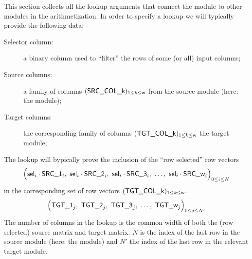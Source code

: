 This section collects all the lookup arguments that connect the \hubMod{} module to other modules in the arithmetization. In order to specify a lookup we will typically provide the following data:
\begin{description}
	\item[Selector column:] a binary column  used to ``filter'' the rows of some (or all) input columns;
	\item[Source columns:] a family of columns $(\textsf{SRC\_COL\_k})_{1 \leq k \leq \textsf{w}}$ from the source module (here: the \hubMod{} module); 
	\item[Target columns:] the corresponding family of columns $(\textsf{TGT\_COL\_k})_{1 \leq k \leq \textsf{w}}$ the target module;
\end{description}
The lookup will bypically prove the inclusion of the ``row selected'' row vectors
\[
	\Big(
		\textsf{sel}_{i} \cdot \textsf{SRC\_1}_{i}, ~
		\textsf{sel}_{i} \cdot \textsf{SRC\_2}_{i}, ~
		\textsf{sel}_{i} \cdot \textsf{SRC\_3}_{i}, ~
		\dots, ~
		\textsf{sel}_{i} \cdot \textsf{SRC\_w}_{i}
	\Big)_{0 \leq i \leq N}
\]
in the corresponding set of row vectors $(\textsf{TGT\_COL\_k})_{1 \leq k \leq \textsf{w}}$.
\[
	\Big(
		\textsf{TGT\_1}_{j}, ~
		\textsf{TGT\_2}_{j}, ~
		\textsf{TGT\_3}_{j}, ~
		\dots, ~
		\textsf{TGT\_w}_{j}
	\Big)_{0 \leq j \leq N'}
\]
\saNote{} The number of columns in the lookup  is the common width of both the (row selected) source matrix and target matrix. $N$ is the index of the last row in the source module (here: the \hubMod{} module) and $N'$ the index of the last row in the relevant target module.
